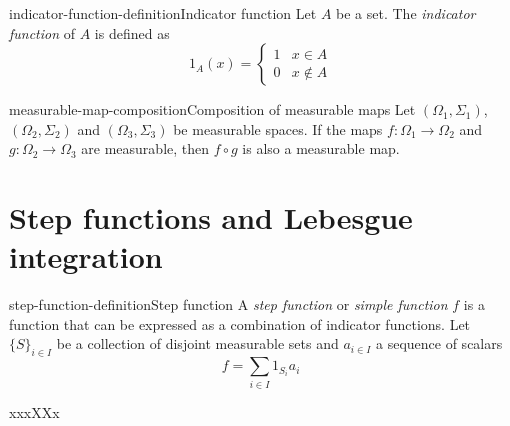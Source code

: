 \documentclass[preview]{standalone}
\begin{document}

\begin{snippetdefinition}{indicator-function-definition}{Indicator function}
    Let \(A\) be a set.
    The \textit{indicator function} of \(A\) is defined as
    \[
        1_{A}(x) = \begin{cases}
            1 & x \in A \\
            0 & x \notin A
        \end{cases}
    \]
\end{snippetdefinition}


\begin{snippetproposition}{measurable-map-composition}{Composition of measurable maps}
    Let \((\Omega_1, \Sigma_1)\), \((\Omega_2, \Sigma_2)\) and \((\Omega_3, \Sigma_3)\)
    be measurable spaces.
    If the maps \(f\colon \Omega_1 \to \Omega_2\) and \(g\colon \Omega_2 \to \Omega_3\)
    are measurable, then \(f \circ g\) is also a measurable map.
\end{snippetproposition}


\section{Step functions and Lebesgue integration}

\begin{snippetdefinition}{step-function-definition}{Step function}
    A \textit{step function} or \textit{simple function} \(f\) is a function that can be
    expressed as a combination of indicator functions.
    Let \(\{S\}_{i \in I}\) be a collection of disjoint measurable sets and \(a_{i \in I}\) a sequence of scalars
    \[
        f = \sum_{i \in I} 1_{S_i} a_i
    \]
\end{snippetdefinition}

\begin{snippetdefinition}{xxx}{XXx}
\end{snippetdefinition}

\end{document}
